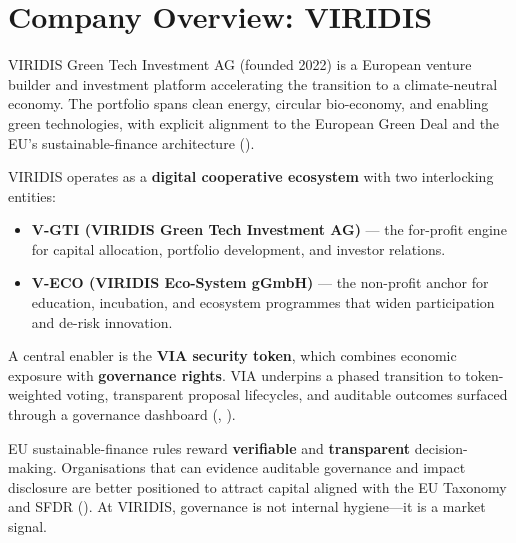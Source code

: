 \documentclass[
  english,
  12pt,
  oneside,
  open=any]{scrbook}
\providecommand{\tightlist}{%
  \setlength{\itemsep}{0pt}\setlength{\parskip}{0pt}}\usepackage{longtable,booktabs,array}
\begin{document}
\section{Company Overview: VIRIDIS}\label{sec-company}

VIRIDIS Green Tech Investment AG (founded 2022) is a European venture
builder and investment platform accelerating the transition to a
climate-neutral economy. The portfolio spans clean energy, circular
bio-economy, and enabling green technologies, with explicit alignment to
the European Green Deal and the EU's sustainable-finance architecture
().

VIRIDIS operates as a \textbf{digital cooperative ecosystem} with two
interlocking entities:

\begin{itemize}
\tightlist
\item
  \textbf{V-GTI (VIRIDIS Green Tech Investment AG)} --- the for-profit
  engine for capital allocation, portfolio development, and investor
  relations.\\
\item
  \textbf{V-ECO (VIRIDIS Eco-System gGmbH)} --- the non-profit anchor
  for education, incubation, and ecosystem programmes that widen
  participation and de-risk innovation.
\end{itemize}

A central enabler is the \textbf{VIA security token}, which combines
economic exposure with \textbf{governance rights}. VIA underpins a
phased transition to token-weighted voting, transparent proposal
lifecycles, and auditable outcomes surfaced through a governance
dashboard (,
).

\begin{tcolorbox}[enhanced jigsaw, colframe=quarto-callout-note-color-frame, coltitle=black, titlerule=0mm, opacitybacktitle=0.6, colback=white, toprule=.15mm, leftrule=.75mm, rightrule=.15mm, opacityback=0, toptitle=1mm, bottomtitle=1mm, bottomrule=.15mm, title=\textcolor{quarto-callout-note-color}{\faInfo}\hspace{0.5em}{Why governance matters now}, arc=.35mm, left=2mm, colbacktitle=quarto-callout-note-color!10!white, breakable]

EU sustainable-finance rules reward \textbf{verifiable} and
\textbf{transparent} decision-making. Organisations that can evidence
auditable governance and impact disclosure are better positioned to
attract capital aligned with the EU Taxonomy and SFDR
(). At VIRIDIS, governance is not internal hygiene---it is a market
signal.

\end{tcolorbox}
\end{document}
